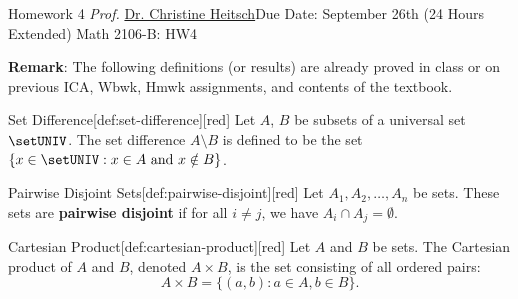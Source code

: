 \newpage{}
{Homework 4}
{\textit{Prof.} \href{https://ceheitsch.github.io/webpage/}{Dr. Christine Heitsch}}{Due Date: September 26th (24 Hours Extended)}
{Math 2106-B: HW4}
\newpage




\textbf{Remark}: The following definitions (or results) are already proved in class or on previous ICA, 
Wbwk, Hmwk assignments, and contents of the textbook.





\begin{define}{Set Difference}[def:set-difference][red]
  Let $A$, $B$ be subsets of a universal set $\setUNIV$. The set difference $A \setminus B$ is defined to be the set $\{ x \in \setUNIV : x \in A \text{ and } x \notin B\}$.
\end{define}

\begin{define}{Pairwise Disjoint Sets}[def:pairwise-disjoint][red]
  Let $A_1, A_2, \ldots, A_n$ be sets. These sets are \textbf{pairwise disjoint} if for all $i \neq j$, we have $A_i \cap A_j = \emptyset$.
\end{define}

\begin{define}{Cartesian Product}[def:cartesian-product][red]
  Let $A$ and $B$ be sets. The Cartesian product of $A$ and $B$, denoted $A \times B$, is the set consisting of all ordered pairs:
  \[
  A \times B = \{(a, b) : a \in A, b \in B\}.
  \]
\end{define}






